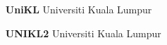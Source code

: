 \begin{Glossary}
\addtolength{\columnsep}{2em}
\begin{multicols}{2}
{
\singlespacing

\begin{enumerate}
\item[\textbf{UniKL}] 	Universiti Kuala Lumpur

\columnbreak
\item[\textbf{UNIKL2}]  Universiti Kuala Lumpur

\end{enumerate}
}
\end{multicols}
\end{Glossary}